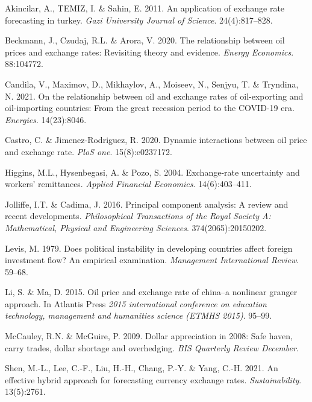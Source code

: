 \documentclass[11pt,preprint, authoryear]{elsarticle}
\numberwithin{equation}{section}
\numberwithin{figure}{section}
\numberwithin{table}{section}
\newlength{\cslhangindent}
\newenvironment{CSLReferences}%
  {\setlength{\parindent}{0pt}%
  \everypar{\setlength{\hangindent}{\cslhangindent}}\ignorespaces}%
  {\par}
\begin{document}
\hypertarget{refs}{}
\begin{CSLReferences}{1}{0}
\leavevmode{}%
Akincilar, A., TEMIZ, I. \& Sahin, E. 2011. An application of exchange
rate forecasting in turkey. \emph{Gazi University Journal of Science}.
24(4):817--828.

\leavevmode{}%
Beckmann, J., Czudaj, R.L. \& Arora, V. 2020. The relationship between
oil prices and exchange rates: Revisiting theory and evidence.
\emph{Energy Economics}. 88:104772.

\leavevmode{}%
Candila, V., Maximov, D., Mikhaylov, A., Moiseev, N., Senjyu, T. \&
Tryndina, N. 2021. On the relationship between oil and exchange rates of
oil-exporting and oil-importing countries: From the great recession
period to the COVID-19 era. \emph{Energies}. 14(23):8046.

\leavevmode{}%
Castro, C. \& Jimenez-Rodriguez, R. 2020. Dynamic interactions between
oil price and exchange rate. \emph{PloS one}. 15(8):e0237172.

\leavevmode{}%
Higgins, M.L., Hysenbegasi, A. \& Pozo, S. 2004. Exchange-rate
uncertainty and workers' remittances. \emph{Applied Financial
Economics}. 14(6):403--411.

\leavevmode{}%
Jolliffe, I.T. \& Cadima, J. 2016. Principal component analysis: A
review and recent developments. \emph{Philosophical Transactions of the
Royal Society A: Mathematical, Physical and Engineering Sciences}.
374(2065):20150202.

\leavevmode{}%
Levis, M. 1979. Does political instability in developing countries
affect foreign investment flow? An empirical examination.
\emph{Management International Review}. 59--68.

\leavevmode{}%
Li, S. \& Ma, D. 2015. Oil price and exchange rate of china--a nonlinear
granger approach. In Atlantis Press \emph{2015 international conference
on education technology, management and humanities science (ETMHS
2015)}. 95--99.

\leavevmode{}%
McCauley, R.N. \& McGuire, P. 2009. Dollar appreciation in 2008: Safe
haven, carry trades, dollar shortage and overhedging. \emph{BIS
Quarterly Review December}.

\leavevmode{}%
Shen, M.-L., Lee, C.-F., Liu, H.-H., Chang, P.-Y. \& Yang, C.-H. 2021.
An effective hybrid approach for forecasting currency exchange rates.
\emph{Sustainability}. 13(5):2761.

\end{CSLReferences}
\end{document}
